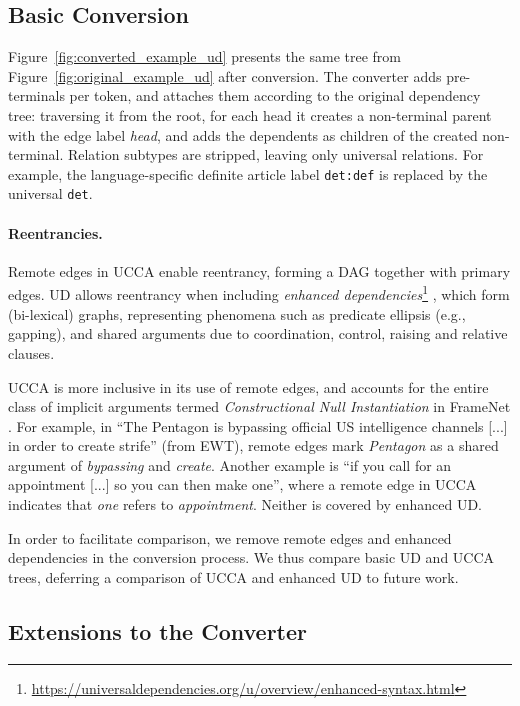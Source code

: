 \documentclass[11pt,a4paper,table]{article}
\begin{document}
\subsection{Basic Conversion}\label{sec:conversion}

Figure~\ref{fig:converted_example_ud} presents the same tree from Figure~\ref{fig:original_example_ud}
after conversion.
The converter adds pre-terminals per token,
and attaches them according to the original dependency tree:
traversing it from the root, for each head it creates a non-terminal
parent with the edge label {\it head}, and adds the dependents as children of 
the created non-terminal.
Relation subtypes are stripped,
leaving only universal relations.
For example, the language-specific definite article label
\texttt{det:def} is replaced by the universal \texttt{det}.

\paragraph{Reentrancies.}
Remote edges in UCCA enable reentrancy, forming a DAG together with primary edges.
UD allows reentrancy when including \textit{enhanced dependencies}\footnote{\url{https://universaldependencies.org/u/overview/enhanced-syntax.html}}
\cite{SCHUSTER16.779}, which form (bi-lexical) graphs, representing phenomena
such as predicate ellipsis (e.g., gapping),
and shared arguments due to coordination, control, raising and relative clauses.

UCCA is more inclusive in its use of remote edges, and accounts for 
the entire class of implicit arguments termed {\it Constructional Null Instantiation} in FrameNet \citep{Ruppenhofer:16}.
For example, in
``The Pentagon is bypassing official US intelligence channels [...] in order to create strife'' (from EWT),
remote edges mark \textit{Pentagon} as a shared argument of \textit{bypassing} and
\textit{create}. 
Another example is ``if you call for an appointment [...] so you can then make one'',
where a remote edge in UCCA indicates that \textit{one} refers to \textit{appointment}.
Neither is covered by enhanced UD.

In order to facilitate comparison, we remove remote edges and enhanced dependencies in the conversion process.
We thus compare basic UD and UCCA trees, deferring a comparison of UCCA and enhanced UD to future work.



\subsection{Extensions to the Converter}\label{sec:local}
\end{document}
